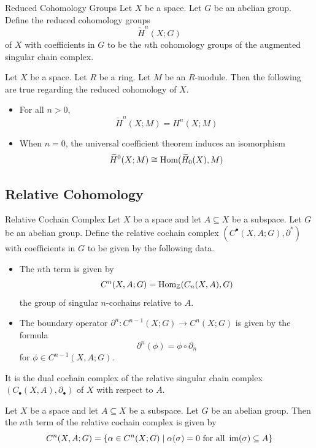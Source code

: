 \documentclass[a4paper]{article}
\begin{document}
\begin{defn}{Reduced Cohomology Groups}{} Let $X$ be a space. Let $G$ be an abelian group. Define the reduced cohomology groups $$\widetilde{H}^n(X;G)$$ of $X$ with coefficients in $G$ to be the $n$th cohomology groups of the augmented singular chain complex. 
\end{defn}

\begin{prp}{}{} Let $X$ be a space. Let $R$ be a ring. Let $M$ be an $R$-module. Then the following are true regarding the reduced cohomology of $X$. 
\begin{itemize}
\item For all $n>0$, $$\widetilde{H}^n(X;M)=H^n(X;M)$$
\item When $n=0$, the universal coefficient theorem induces an isomorphism $$\widetilde{H}^0(X;M)\cong\operatorname{Hom}(\widetilde{H}_0(X),M)$$
\end{itemize}
\end{prp}

\subsection{Relative Cohomology}
\begin{defn}{Relative Cochain Complex}{} Let $X$ be a space and let $A\subseteq X$ be a subspace. Let $G$ be an abelian group. Define the relative cochain complex $(C^\bullet(X,A;G),\partial^\ast)$ with coefficients in $G$ to be given by the following data. 
\begin{itemize}
\item The $n$th term is given by $$C^n(X,A;G)=\operatorname{Hom}_{\mathbb{Z}}(C_n(X,A),G)$$ the group of singular $n$-cochains relative to $A$. 
\item The boundary operator $\partial^n:C^{n-1}(X;G)\to C^n(X;G)$ is given by the formula $$\partial^n(\phi)=\phi\circ\partial_n$$ for $\phi\in C^{n-1}(X,A;G)$. 
\end{itemize}
It is the dual cochain complex of the relative singular chain complex $(C_\bullet(X,A),\partial_\bullet)$ of $X$ with respect to $A$. 
\end{defn}

\begin{lmm}{}{} Let $X$ be a space and let $A\subseteq X$ be a subspace. Let $G$ be an abelian group. Then the $n$th term of the relative cochain complex is given by $$C^n(X,A;G)=\{\alpha\in C^n(X;G)\;|\;\alpha(\sigma)=0\text{ for all }\operatorname{im}(\sigma)\subseteq A\}$$
\end{lmm}
\end{document}
